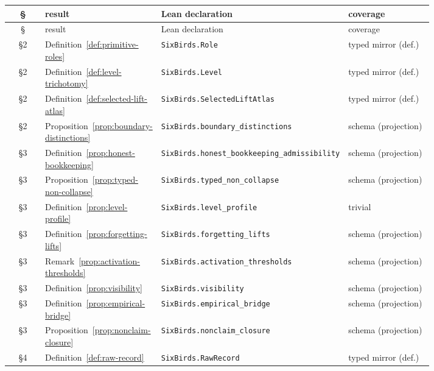 {\footnotesize
\begin{longtable}{@{}c >{\raggedright\arraybackslash}p{0.27\linewidth} >{\raggedright\arraybackslash}p{0.34\linewidth} >{\raggedright\arraybackslash}p{0.20\linewidth}@{}}
\toprule
\S & result & Lean declaration & coverage \\
\midrule
\endfirsthead
\toprule
\S & result & Lean declaration & coverage \\
\midrule
\endhead
\bottomrule
\endfoot
§2 & Definition~\ref{def:primitive-roles} & \texttt{SixBirds.\allowbreak Role} & typed mirror (def.) \\
§2 & Definition~\ref{def:level-trichotomy} & \texttt{SixBirds.\allowbreak Level} & typed mirror (def.) \\
§2 & Definition~\ref{def:selected-lift-atlas} & \texttt{SixBirds.\allowbreak SelectedLiftAtlas} & typed mirror (def.) \\
§2 & Proposition~\ref{prop:boundary-distinctions} & \texttt{SixBirds.\allowbreak boundary\_\allowbreak distinctions} & schema (projection) \\
§3 & Definition~\ref{prop:honest-bookkeeping} & \texttt{SixBirds.\allowbreak honest\_\allowbreak bookkeeping\_\allowbreak admissibility} & schema (projection) \\
§3 & Proposition~\ref{prop:typed-non-collapse} & \texttt{SixBirds.\allowbreak typed\_\allowbreak non\_\allowbreak collapse} & schema (projection) \\
§3 & Definition~\ref{prop:level-profile} & \texttt{SixBirds.\allowbreak level\_\allowbreak profile} & trivial \\
§3 & Definition~\ref{prop:forgetting-lifts} & \texttt{SixBirds.\allowbreak forgetting\_\allowbreak lifts} & schema (projection) \\
§3 & Remark~\ref{prop:activation-thresholds} & \texttt{SixBirds.\allowbreak activation\_\allowbreak thresholds} & schema (projection) \\
§3 & Definition~\ref{prop:visibility} & \texttt{SixBirds.\allowbreak visibility} & schema (projection) \\
§3 & Definition~\ref{prop:empirical-bridge} & \texttt{SixBirds.\allowbreak empirical\_\allowbreak bridge} & schema (projection) \\
§3 & Proposition~\ref{prop:nonclaim-closure} & \texttt{SixBirds.\allowbreak nonclaim\_\allowbreak closure} & schema (projection) \\
§4 & Definition~\ref{def:raw-record} & \texttt{SixBirds.\allowbreak RawRecord} & typed mirror (def.) \\

\end{longtable}}
